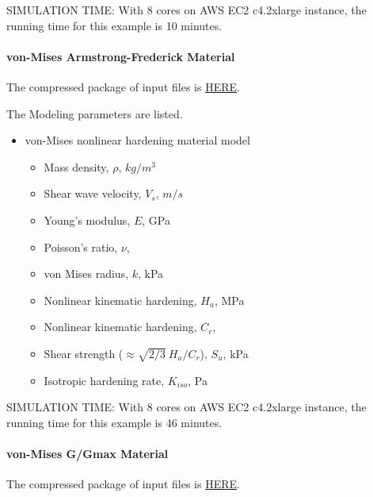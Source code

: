 SIMULATION TIME: With 8 cores on AWS EC2 c4.2xlarge instance, the running time for this example is 10 minutes.

\paragraph{von-Mises Armstrong-Frederick Material}
The compressed package of input files is  
\href{https://github.com/yuan-energy/Real-ESSI-Short-Course-Examples/tree/master/short-course-examples/nonlinear_analysis_steps/soil-structure/vonMisesArmstrongFrederick/vonMisesArmstrongFrederick.tgz?raw=true}{HERE}. 


The Modeling parameters are listed.
\begin{itemize}
  \item von-Mises nonlinear hardening material model 
  \begin{itemize}
    \item Mass density, $\rho$, \enspace {} $kg/m^3$
    \item Shear wave velocity, $V_s$, \enspace {} $m/s$
    \item Young's modulus, $E$, \enspace {} GPa
    \item Poisson's ratio, $\nu$, \enspace {}
    \item von Mises radius, $k$, \enspace {} kPa
    \item Nonlinear kinematic hardening, $H_a$, \enspace {} MPa
    \item Nonlinear kinematic hardening, $C_r$, \enspace {}
    \item Shear strength ($\approx \sqrt{2/3}\ {H_a/C_r} $), $S_u$, \enspace {} kPa
    \item Isotropic hardening rate, $K_{iso}$, \enspace {} Pa
  \end{itemize}
\end{itemize}


SIMULATION TIME: With 8 cores on AWS EC2 c4.2xlarge instance, the running time for this example is 46 minutes.

\paragraph{von-Mises G/Gmax Material}
The compressed package of input files is  
\href{https://github.com/yuan-energy/Real-ESSI-Short-Course-Examples/tree/master/short-course-examples/nonlinear_analysis_steps/soil-structure/vonMisesGoverGmax/vonMisesGoverGmax.tgz?raw=true}{HERE}. 

